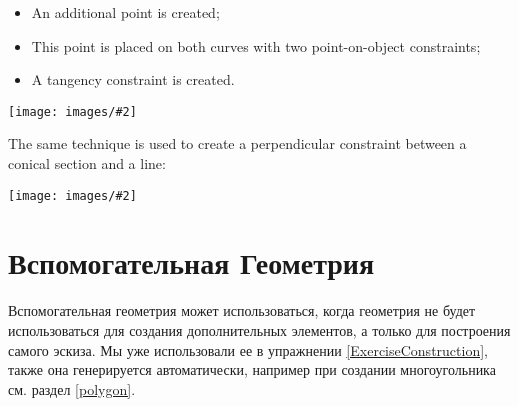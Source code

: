 \documentclass[12pt,titlepage]{article}
\newcommand{\img}[2]{\vspace{2ex}\noindent\texttt{[image: images/\#2]}}
\begin{document}
\begin{itemize}
\item An additional point is created;
\item This point is placed on both curves with two point-on-object constraints;
\item A tangency constraint is created.
\end{itemize}

\img{scale=1}{ConicalTangent}

The same technique is used to create a perpendicular constraint between a conical section and a line:

\img{scale=1}{ConicalPerpendicular}

\section{Вспомогательная Геометрия}
\label{ConstructionGeometry}
\vbox{
Вспомогательная геометрия может использоваться, когда геометрия не будет использоваться для создания дополнительных элементов, а только для построения самого эскиза. Мы  уже использовали ее в упражнении \vref {ExerciseConstruction}, также она генерируется автоматически, например при создании многоугольника см. раздел \vref {polygon}.
}
\end{document}
